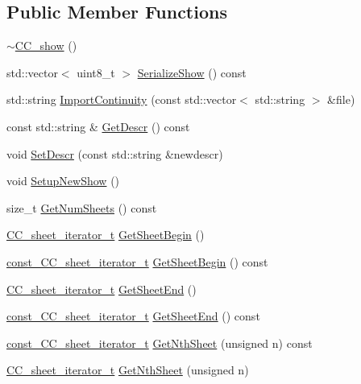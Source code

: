 \subsection*{Public Member Functions}
\begin{DoxyCompactItemize}
\item 
\hyperlink{a00046_adb0b9777199348cbcb2d7b3f6b347957}{$\sim$\-C\-C\-\_\-show} ()
\item 
std\-::vector$<$ uint8\-\_\-t $>$ \hyperlink{a00046_a6a6a385f78b29ce3458ef51252cbc097}{Serialize\-Show} () const 
\item 
std\-::string \hyperlink{a00046_a2cf3f8b86348dc2bd6c60c907df3af34}{Import\-Continuity} (const std\-::vector$<$ std\-::string $>$ \&file)
\item 
const std\-::string \& \hyperlink{a00046_a2a2868bd256e0e58625ea3e18e0dff64}{Get\-Descr} () const 
\item 
void \hyperlink{a00046_afdd41c3616a9ff29e5adecaf4ddd4104}{Set\-Descr} (const std\-::string \&newdescr)
\item 
void \hyperlink{a00046_a643c649260db11e572500716fb3c68c2}{Setup\-New\-Show} ()
\item 
size\-\_\-t \hyperlink{a00046_a1c78681bfb13e117f5cd29efcd3747e8}{Get\-Num\-Sheets} () const 
\item 
\hyperlink{a00046_a53c7d0b304ced90d330ea5076f1bee89}{C\-C\-\_\-sheet\-\_\-iterator\-\_\-t} \hyperlink{a00046_ae40c98fb5b7bb3a166b2bd055e354fa3}{Get\-Sheet\-Begin} ()
\item 
\hyperlink{a00046_aaaf1345012d2f833d1c8f28f9b8593ff}{const\-\_\-\-C\-C\-\_\-sheet\-\_\-iterator\-\_\-t} \hyperlink{a00046_a6c006e3df69af03921eefa243de97a6a}{Get\-Sheet\-Begin} () const 
\item 
\hyperlink{a00046_a53c7d0b304ced90d330ea5076f1bee89}{C\-C\-\_\-sheet\-\_\-iterator\-\_\-t} \hyperlink{a00046_a119bd469349d5a61a60bd8dbc9bca14d}{Get\-Sheet\-End} ()
\item 
\hyperlink{a00046_aaaf1345012d2f833d1c8f28f9b8593ff}{const\-\_\-\-C\-C\-\_\-sheet\-\_\-iterator\-\_\-t} \hyperlink{a00046_a832147c4de2446f867a812658bcff129}{Get\-Sheet\-End} () const 
\item 
\hyperlink{a00046_aaaf1345012d2f833d1c8f28f9b8593ff}{const\-\_\-\-C\-C\-\_\-sheet\-\_\-iterator\-\_\-t} \hyperlink{a00046_a5a23e2e0945764783bce49d197a57e2e}{Get\-Nth\-Sheet} (unsigned n) const 
\item 
\hyperlink{a00046_a53c7d0b304ced90d330ea5076f1bee89}{C\-C\-\_\-sheet\-\_\-iterator\-\_\-t} \hyperlink{a00046_a42684c27e1819df62f4d9f9f51dc8d1a}{Get\-Nth\-Sheet} (unsigned n)

\end{DoxyCompactItemize}
